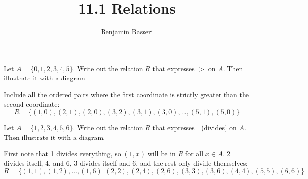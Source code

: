 \documentclass{article}
\title{11.1 Relations}
\author{Benjamin Basseri}
\begin{document}
\maketitle

\begin{problem}
Let $A = \{0, 1, 2, 3, 4, 5\}$. Write out the relation $R$ that expresses $ > $ on $A$. Then illustrate it with a diagram.
\end{problem}

Include all the ordered pairs where the first coordinate is strictly greater than the second coordinate:
$$R = \{(1, 0), (2, 1), (2, 0), (3, 2), (3, 1), (3, 0), \ldots , (5, 1), (5, 0)\}$$
\begin{center}


\end{center}
\begin{problem}
Let $A = \{1, 2, 3, 4, 5, 6\}$. Write out the relation $R$ that expresses $\mid$ (divides) on $A$. Then illustrate it with a diagram.
\end{problem}

First note that 1 divides everything, so $(1, x)$ will be in $R$ for all $x \in A$. 2 divides itself, 4, and 6, 3 divides itself and 6, and the rest only divide themselves:
$$R = \{(1, 1), (1, 2), \ldots, (1, 6), (2, 2), (2, 4), (2, 6), (3, 3), (3, 6), (4, 4), (5, 5), (6, 6)\}$$
\end{document}
